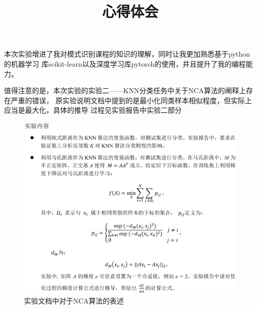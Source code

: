 \documentclass[notitlepage]{article}
\title{心得体会}
\author{}
\date{}
\begin{document}
\maketitle

\vspace{-4em}

本次实验增进了我对模式识别课程的知识的理解，同时让我更加熟悉基于python的机器学习
库scikit-learn以及深度学习库pytorch的使用，并且提升了我的编程能力。

值得注意的是，本次实验的实验二——KNN分类任务中关于NCA算法的阐释上存在严重的错误，
原实验说明文档中提到的是最小化同类样本相似程度，但实际上应当是最大化，具体的推导
过程见实验报告中实验二部分

\begin{figure}[htbp]
    \centering
    \includegraphics[width=\columnwidth]{imgs/nca.png}
    \caption{实验文档中对于NCA算法的表述}
\end{figure}
\end{document}
